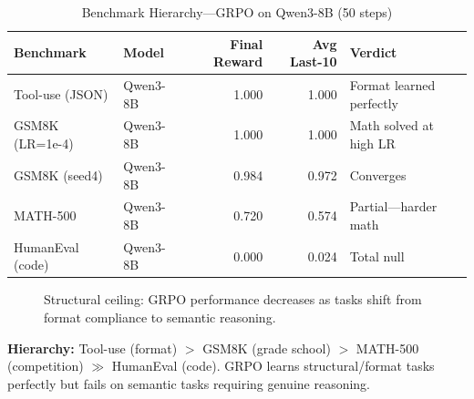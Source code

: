 \documentclass[12pt,a4paper]{report}
\theoremstyle{definition}
\begin{document}
\begin{table}[htbp]
\centering
\caption{Benchmark Hierarchy---GRPO on Qwen3-8B (50 steps)}
\label{tab:benchmark-hierarchy}
\begin{tabular}{llrrl}
\toprule
\textbf{Benchmark} & \textbf{Model} & \textbf{Final Reward} & \textbf{Avg Last-10} & \textbf{Verdict} \\
\midrule
Tool-use (JSON) & Qwen3-8B & 1.000 & 1.000 & Format learned perfectly \\
GSM8K (LR=1e-4) & Qwen3-8B & 1.000 & 1.000 & Math solved at high LR \\
GSM8K (seed4) & Qwen3-8B & 0.984 & 0.972 & Converges \\
MATH-500 & Qwen3-8B & 0.720 & 0.574 & Partial---harder math \\
HumanEval (code) & Qwen3-8B & 0.000 & 0.024 & Total null \\
\bottomrule
\end{tabular}
\end{table}


\begin{figure}[htbp]
\centering
{}
\caption{Structural ceiling: GRPO performance decreases as tasks shift from format compliance to semantic reasoning.}
\label{fig:structural-ceiling}
\end{figure}

\textbf{Hierarchy:} Tool-use (format) $>$ GSM8K (grade school) $>$ MATH-500 (competition) $\gg$ HumanEval (code).
GRPO learns structural/format tasks perfectly but fails on semantic tasks requiring genuine reasoning.
\end{document}
